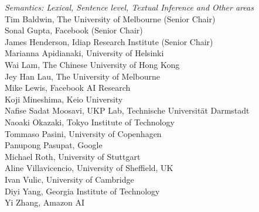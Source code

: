 \emph{Semantics: Lexical, Sentence level, Textual Inference and Other areas} \\
\hspace*{0.2in} Tim Baldwin, The University of Melbourne (Senior Chair)\\
\hspace*{0.2in} Sonal Gupta, Facebook (Senior Chair)\\
\hspace*{0.2in} James Henderson, Idiap Research Institute (Senior Chair)\\
\hspace*{0.2in} Marianna Apidianaki, University of Helsinki\\
\hspace*{0.2in} Wai Lam, The Chinese University of Hong Kong\\
\hspace*{0.2in} Jey Han Lau, The University of Melbourne\\
\hspace*{0.2in} Mike Lewis, Facebook AI Research\\
\hspace*{0.2in} Koji Mineshima, Keio University\\
\hspace*{0.2in} Nafise Sadat Moosavi, UKP Lab, Technische Universität Darmstadt\\
\hspace*{0.2in} Naoaki Okazaki, Tokyo Institute of Technology\\
\hspace*{0.2in} Tommaso Pasini, University of Copenhagen\\
\hspace*{0.2in} Panupong Pasupat, Google\\
\hspace*{0.2in} Michael Roth, University of Stuttgart\\
\hspace*{0.2in} Aline Villavicencio, University of Sheffield, UK\\
\hspace*{0.2in} Ivan Vulic, University of Cambridge\\
\hspace*{0.2in} Diyi Yang, Georgia Institute of Technology\\
\hspace*{0.2in} Yi Zhang, Amazon AI\\

